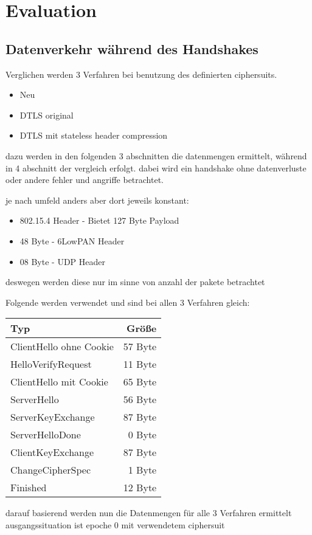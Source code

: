 \chapter{Evaluation}

\section{Datenverkehr während des Handshakes}

Verglichen werden 3 Verfahren bei benutzung des definierten ciphersuits.
\begin{itemize}
  \item Neu
  \item DTLS original
  \item DTLS mit stateless header compression
\end{itemize}
dazu werden in den folgenden 3 abschnitten die datenmengen ermittelt, während in 4 abschnitt der vergleich erfolgt.
dabei wird ein handshake ohne datenverluste oder andere fehler und angriffe betrachtet.

je nach umfeld anders aber dort jeweils konstant:
\begin{itemize}
  \item 802.15.4 Header - Bietet 127 Byte Payload
  \item 48 Byte - 6LowPAN Header
  \item 08 Byte - UDP Header
\end{itemize}
deswegen werden diese nur im sinne von anzahl der pakete betrachtet

Folgende werden verwendet und sind bei allen 3 Verfahren gleich:\\
\begin{tabular}{l|r}
  Typ & Größe\\
  \hline
  ClientHello ohne Cookie & 57 Byte\\
  HelloVerifyRequest      & 11 Byte\\
  ClientHello mit Cookie  & 65 Byte\\
  ServerHello             & 56 Byte\\
  ServerKeyExchange       & 87 Byte\\
  ServerHelloDone         &  0 Byte\\
  ClientKeyExchange       & 87 Byte\\
  ChangeCipherSpec        &  1 Byte\\
  Finished                & 12 Byte    
\end{tabular}

darauf basierend werden nun die Datenmengen für alle 3 Verfahren ermittelt\\
ausgangssituation ist epoche 0 mit verwendetem ciphersuit

